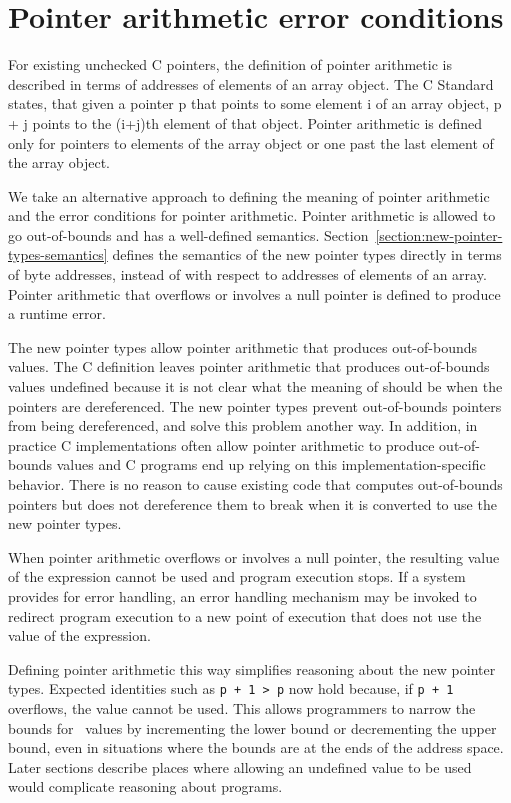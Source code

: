 \section{Pointer arithmetic error conditions}
\label{section:pointer-arithmetic-errors}

For existing unchecked C pointers, the definition of pointer arithmetic is
described in terms of addresses of elements of an array object. The C
Standard \cite{ISO2011} states, that given a pointer p that points to some element i of
an array object, p + j points to the (i+j)th element of that object.
Pointer arithmetic is defined only for pointers to elements of the array
object or one past the last element of the array object.

We take an alternative approach to defining the meaning of pointer
arithmetic and the error conditions for pointer arithmetic. Pointer
arithmetic is allowed to go out-of-bounds and has a well-defined
semantics. Section~\ref{section:new-pointer-types-semantics}
defines the semantics of the new pointer types
directly in terms of byte addresses, instead of with respect to
addresses of elements of an array. Pointer arithmetic that overflows or
involves a null pointer is defined to produce a runtime error.

The new pointer types allow pointer arithmetic that produces
out-of-bounds values. The C definition leaves pointer arithmetic that
produces out-of-bounds values undefined because it is not clear what the
meaning of should be when the pointers are dereferenced. The new pointer
types prevent out-of-bounds pointers from being dereferenced, and solve
this problem another way. In addition, in practice C implementations
often allow pointer arithmetic to produce out-of-bounds values and C
programs end up relying on this implementation-specific behavior. There
is no reason to cause existing code that computes out-of-bounds pointers
but does not dereference them to break when it is converted to use the
new pointer types.

When pointer arithmetic overflows or involves a null pointer, the
resulting value of the expression cannot be used and program execution
stops. If a system provides for error handling, an error handling
mechanism may be invoked to redirect program execution to a new point of
execution that does not use the value of the expression.

Defining pointer arithmetic this way simplifies reasoning about the new
pointer types. Expected identities such as \texttt{p + 1 > p} now hold
because, if \texttt{p + 1} overflows, the value cannot be
used. This allows programmers to narrow the bounds for
\arrayptr\ values by incrementing the lower bound or
decrementing the upper bound, even in situations where the bounds are at
the ends of the address space. Later sections describe places where
allowing an undefined value to be used would complicate reasoning about
programs.

